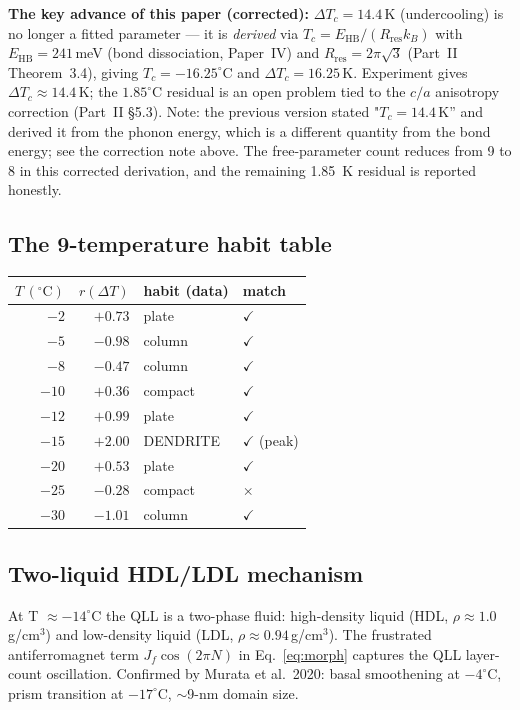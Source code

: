 \documentclass[11pt,a4paper]{article}
\begin{document}
\textbf{The key advance of this paper (corrected):}
$\Delta T_c = 14.4$\,K (undercooling) is no longer a fitted parameter
— it is \emph{derived} via $T_c = E_{\text{HB}}/(R_{\text{res}} k_B)$
with $E_{\text{HB}} = 241$\,meV (bond dissociation, Paper~IV) and
$R_{\text{res}} = 2\pi\sqrt{3}$ (Part~II Theorem~3.4), giving
$T_c = -16.25^{\circ}$C and $\Delta T_c = 16.25$\,K.  Experiment
gives $\Delta T_c \approx 14.4$\,K; the $1.85^{\circ}$C residual is
an open problem tied to the $c/a$ anisotropy correction (Part~II
\S 5.3).  Note: the previous version stated "$T_c = 14.4$\,K'' and
derived it from the phonon energy, which is a different quantity
from the bond energy; see the correction note above.  The
free-parameter count reduces from 9 to 8 in this corrected
derivation, and the remaining 1.85~K residual is reported honestly.

\subsection{The 9-temperature habit table}
\begin{center}\small
\begin{tabular}{rrll}
\toprule
$T\,(^\circ\mathrm{C})$ & $r(\Delta T)$ & habit (data) & match \\
\midrule
$-2$  & $+0.73$ & plate    & $\checkmark$ \\
$-5$  & $-0.98$ & column   & $\checkmark$ \\
$-8$  & $-0.47$ & column   & $\checkmark$ \\
$-10$ & $+0.36$ & compact  & $\checkmark$ \\
$-12$ & $+0.99$ & plate    & $\checkmark$ \\
$-15$ & $+2.00$ & DENDRITE & $\checkmark$ (peak)\\
$-20$ & $+0.53$ & plate    & $\checkmark$ \\
$-25$ & $-0.28$ & compact  & $\times$ \\
$-30$ & $-1.01$ & column   & $\checkmark$ \\
\bottomrule
\end{tabular}
\end{center}

\subsection{Two-liquid HDL/LDL mechanism}
At T $\approx -14^\circ$C the QLL is a two-phase fluid: high-density liquid (HDL, $\rho \approx 1.0$\,g/cm$^3$) and low-density liquid (LDL, $\rho \approx 0.94$\,g/cm$^3$). The frustrated antiferromagnet term $J_f \cos(2\pi N)$ in Eq.~\ref{eq:morph} captures the QLL layer-count oscillation. Confirmed by Murata et al.\ 2020: basal smoothening at $-4^\circ$C, prism transition at $-17^\circ$C, $\sim$9-nm domain size.
\end{document}
